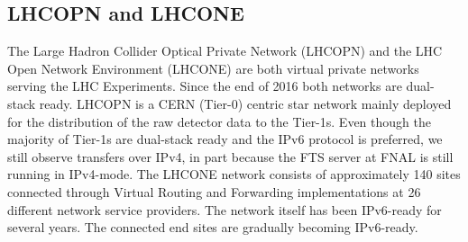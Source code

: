 \subsection{LHCOPN and LHCONE}
The  Large Hadron Collider Optical Private Network (LHCOPN) and the LHC Open Network Environment (LHCONE) are both virtual private networks serving the LHC Experiments. Since the end of 2016 both networks are dual-stack ready. LHCOPN is a CERN (Tier-0) centric star network mainly deployed for the distribution of the raw detector data to the Tier-1s. Even though the majority of Tier-1s are dual-stack ready and the IPv6 protocol is preferred, we still observe transfers over IPv4,  in part because the FTS server at FNAL is still running in IPv4-mode. The LHCONE network consists of approximately 140 sites connected through Virtual Routing and Forwarding implementations at 26 different network service providers. The network itself has been IPv6-ready for several years. The connected end sites are gradually becoming IPv6-ready. 

